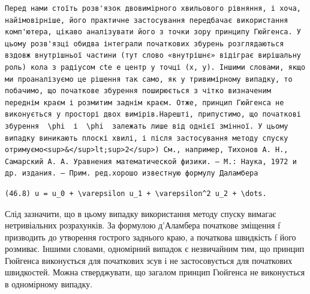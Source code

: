 \documentclass[
  ukrainian,
]{article}
\begin{document}
\begin{verbatim}
Перед нами стоїть розв'язок двовимірного хвильового рівняння, і хоча, найімовірніше, його практичне застосування передбачає використання комп'ютера, цікаво аналізувати його з точки зору принципу Гюйгенса. У цьому розв'язці обидва інтеграли початкових збурень розглядаються вздовж внутрішньої частини (тут слово «внутрішнє» відіграє вирішальну роль) кола з радіусом cte e центр у точці (x, y). Іншими словами, якщо ми проаналізуємо це рішення так само, як у тривимірному випадку, то побачимо, що початкове збурення поширюється з чітко визначеним переднім краєм і розмитим заднім краєм. Отже, принцип Гюйгенса не виконується у просторі двох вимірів.Нарешті, припустимо, що початкові збурення  \phi  і  \phi  залежать лише від однієї змінної. У цьому випадку виникають плоскі хвилі, і після застосування методу спуску отримуємо<sup>&</sup>lt;sup>2</sup>) См., например, Тихонов А. Н., Самарский А. А. Уравнения математической физики. — М.: Наука, 1972 и др. издания. — Прим. ред.хорошо известную формулу Даламбера
\end{verbatim}

\begin{verbatim}
(46.8) u = u_0 + \varepsilon u_1 + \varepsilon^2 u_2 + \dots.
\end{verbatim}

Слід зазначити, що в цьому випадку використання методу спуску вимагає
нетривіальних розрахунків. За формулою д'Аламбера початкове зміщення f
призводить до утворення гострого заднього краю, а початкова швидкість f
його розмиває. Іншими словами, одномірний випадок є незвичайним тим, що
принцип Гюйгенса виконується для початкових зсув і не застосовується для
початкових швидкостей. Можна стверджувати, що загалом принцип Гюйгенса
не виконується в одномірному випадку.
\end{document}
